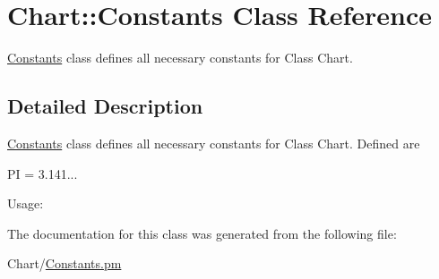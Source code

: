 \hypertarget{classChart_1_1Constants}{
\section{Chart::Constants Class Reference}
\label{classChart_1_1Constants}
}


\hyperlink{classChart_1_1Constants}{Constants} class defines all necessary constants for Class Chart.  




\subsection{Detailed Description}
\hyperlink{classChart_1_1Constants}{Constants} class defines all necessary constants for Class Chart. Defined are \par
 PI = 3.141...\par
 \par
 Usage:\par
 
 

The documentation for this class was generated from the following file:\begin{DoxyCompactItemize}
\item 
Chart/\hyperlink{Constants_8pm}{Constants.pm}\end{DoxyCompactItemize}

